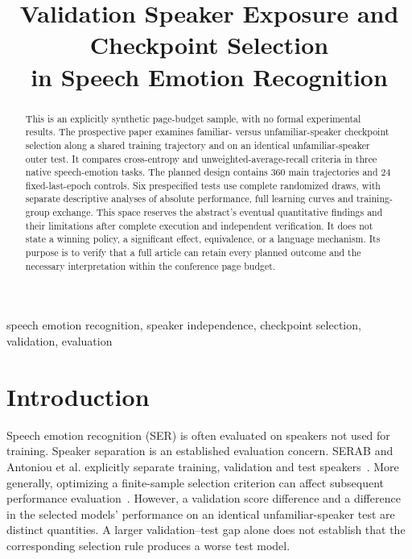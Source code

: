 \documentclass[letterpaper]{article}
\title{Validation Speaker Exposure and Checkpoint Selection\\in Speech Emotion Recognition}
\begin{document}
\maketitle
\begin{abstract}
This is an explicitly synthetic page-budget sample, with no formal experimental results. The prospective paper examines familiar- versus unfamiliar-speaker checkpoint selection along a shared training trajectory and on an identical unfamiliar-speaker outer test. It compares cross-entropy and unweighted-average-recall criteria in three native speech-emotion tasks. The planned design contains 360 main trajectories and 24 fixed-last-epoch controls. Six prespecified tests use complete randomized draws, with separate descriptive analyses of absolute performance, full learning curves and training-group exchange. This space reserves the abstract's eventual quantitative findings and their limitations after complete execution and independent verification. It does not state a winning policy, a significant effect, equivalence, or a language mechanism. Its purpose is to verify that a full article can retain every planned outcome and the necessary interpretation within the conference page budget.
\end{abstract}
\begin{keywords}
speech emotion recognition, speaker independence, checkpoint selection, validation, evaluation
\end{keywords}
\section{Introduction}
Speech emotion recognition (SER) is often evaluated on speakers not used for training. Speaker separation is an established evaluation concern. SERAB and Antoniou et al. explicitly separate training, validation and test speakers~\cite{serab,antoniou}. More generally, optimizing a finite-sample selection criterion can affect subsequent performance evaluation~\cite{cawley}. However, a validation score difference and a difference in the selected models' performance on an identical unfamiliar-speaker test are distinct quantities. A larger validation--test gap alone does not establish that the corresponding selection rule produces a worse test model.
\end{document}
